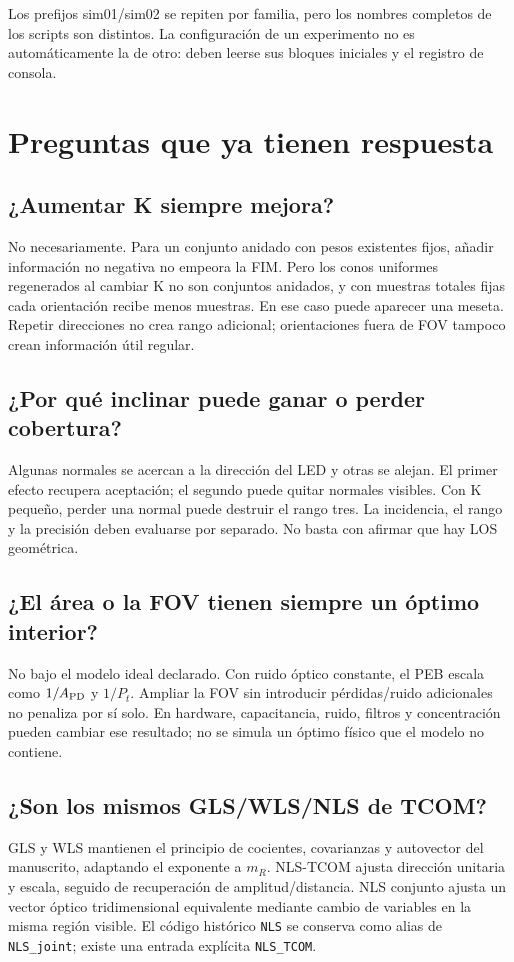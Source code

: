 \documentclass[11pt,a4paper]{article}
\begin{document}
Los prefijos sim01/sim02 se repiten por familia, pero los nombres completos de los scripts son distintos. La configuración de un experimento no es automáticamente la de otro: deben leerse sus bloques iniciales y el registro de consola.

\section{Preguntas que ya tienen respuesta}
\subsection{¿Aumentar K siempre mejora?}
No necesariamente. Para un conjunto anidado con pesos existentes fijos, añadir información no negativa no empeora la FIM. Pero los conos uniformes regenerados al cambiar K no son conjuntos anidados, y con muestras totales fijas cada orientación recibe menos muestras. En ese caso puede aparecer una meseta. Repetir direcciones no crea rango adicional; orientaciones fuera de FOV tampoco crean información útil regular.

\subsection{¿Por qué inclinar puede ganar o perder cobertura?}
Algunas normales se acercan a la dirección del LED y otras se alejan. El primer efecto recupera aceptación; el segundo puede quitar normales visibles. Con K pequeño, perder una normal puede destruir el rango tres. La incidencia, el rango y la precisión deben evaluarse por separado. No basta con afirmar que hay LOS geométrica.

\subsection{¿El área o la FOV tienen siempre un óptimo interior?}
No bajo el modelo ideal declarado. Con ruido óptico constante, el PEB escala como $1/A_{\rm PD}$ y $1/P_t$. Ampliar la FOV sin introducir pérdidas/ruido adicionales no penaliza por sí solo. En hardware, capacitancia, ruido, filtros y concentración pueden cambiar ese resultado; no se simula un óptimo físico que el modelo no contiene.

\subsection{¿Son los mismos GLS/WLS/NLS de TCOM?}
GLS y WLS mantienen el principio de cocientes, covarianzas y autovector del manuscrito, adaptando el exponente a $m_R$. NLS-TCOM ajusta dirección unitaria y escala, seguido de recuperación de amplitud/distancia. NLS conjunto ajusta un vector óptico tridimensional equivalente mediante cambio de variables en la misma región visible. El código histórico \texttt{NLS} se conserva como alias de \texttt{NLS\_joint}; existe una entrada explícita \texttt{NLS\_TCOM}.
\end{document}
